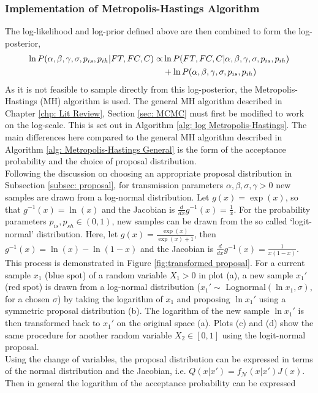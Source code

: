 \subsubsection{Implementation of Metropolis-Hastings Algorithm}
The log-likelihood and log-prior defined above are then combined to form the log-posterior,
\begin{align} \notag
\ln P(\alpha, \beta, \gamma, \sigma, p_{is}, p_{ih} | FT, FC, C) \propto &\ln P(FT, FC, C | \alpha, \beta, \gamma, \sigma, p_{is}, p_{ih} ) \\ 
&+ \ln P(\alpha, \beta, \gamma, \sigma, p_{is}, p_{ih})
\end{align}
As it is not feasible to sample directly from this log-posterior, the Metropolis-Hastings (MH) algorithm is used. The general MH algorithm described in Chapter \ref{chp: Lit Review}, Section \ref{sec: MCMC} must first be modified to work on the log-scale. This is set out in Algorithm \ref{alg: log Metropolis-Hastings}. The main differences here compared to the general MH algorithm described in Algorithm \ref{alg: Metropolis-Hastings General} is the form of the acceptance probability and the choice of proposal distribution.\\
Following the discussion on choosing an appropriate proposal distribution in Subsection \ref{subsec: proposal}, for transmission parameters $\alpha, \beta, \sigma, \gamma > 0$ new samples are drawn from a log-normal distribution. Let $g(x) = \exp(x)$, so that $g^{-1}(x) = \ln(x)$ and the Jacobian is $\frac{d}{dx}g^{-1}(x) = \frac{1}{x}$.
For the probability parameters $p_{is}, p_{sh} \in (0,1)$, new samples can be drawn from the so called `logit-normal' distribution. Here, let $g(x) = \frac{\exp(x)}{\exp(x)+1}$, then $g^{-1}(x) = \ln(x) - \ln(1-x)$ and the Jacobian is $\frac{d}{dx}g^{-1}(x) = \frac{1}{x(1-x)}$. \\
This process is demonstrated in Figure \ref{fig:transformed proposal}. For a current sample $x_1$ (blue spot) of a random variable $X_1>0$ in plot (a), a new sample $x_1'$ (red spot) is drawn from a log-normal distribution ($x_1' \sim$ Lognormal$(\ln x_1, \sigma)$, for a chosen $\sigma$) by taking the logarithm of $x_1$ and proposing $\ln x_1'$ using a symmetric proposal distribution (b). The logarithm of the new sample $\ln x_1'$ is then transformed back to $x_1'$ on the original space (a). Plots (c) and (d) show the same procedure for another random variable $X_2 \in [0,1]$ using the logit-normal proposal. \\
Using the change of variables, the proposal distribution can be expressed in terms of the normal distribution and the Jacobian, i.e. $Q(x|x')=f_{\mathcal{N}}(x | x')J(x)$. Then in general the logarithm of the acceptance probability can be expressed

